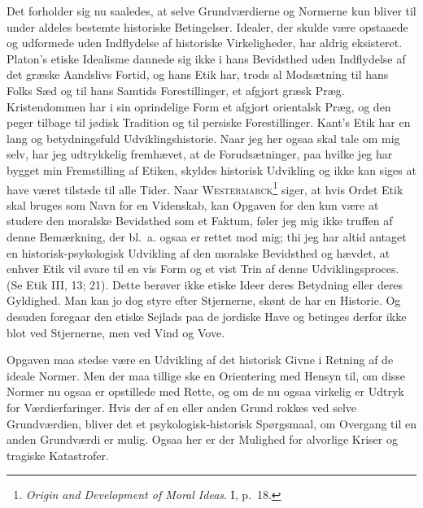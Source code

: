 \documentclass[12pt]{article}
\newcommand{\opage}[1]{\marginnote{\footnotesize\textit{[#1]}}}
\begin{document}
Det forholder sig nu saaledes, at selve Grundværdierne og Normerne kun
bliver til under aldeles bestemte historiske Betingelser. Idealer, der
skulde være opstaaede og udformede uden Indflydelse af historiske
Virkeligheder, har aldrig eksisteret. Platon's etiske Idealisme dannede
sig ikke i hans Bevidsthed uden Indflydelse af det græske Aandslivs
Fortid, og hans Etik har, trods al Modsætning til hans Folks Sæd og til
hans Samtids Forestillinger, et afgjort græsk Præg. Kristendommen har i
sin oprindelige Form et afgjort orientalsk Præg, og den peger tilbage
til jødisk Tradition og til persiske Forestillinger. Kant's Etik har en
lang og betydningsfuld Udviklingshistorie. Naar jeg her ogsaa skal tale
om mig selv, har jeg udtrykkelig fremhævet, at de Forudsætninger, paa
hvilke jeg har bygget min Fremstilling af Etiken, skyldes historisk
Udvikling og ikke kan siges at have været tilstede til alle Tider. Naar
\textsc{Westermarck}\footnote{\textit{Origin and Development of Moral
Ideas}. I, p.~18.} siger, at hvis Ordet \guillemotright
Etik\guillemotleft{} skal bruges som Navn for en Videnskab, kan Opgaven
for den kun være at studere den moralske Bevidsthed som et Faktum, føler
jeg mig ikke truffen af denne Bemærkning, der bl.~a. ogsaa er rettet mod
mig; thi jeg har altid antaget en historisk-psykologisk Udvikling af den
moralske Bevidsthed og hævdet, at enhver Etik vil svare til en vis Form
og et vist Trin af denne Udviklingsproces. (Se Etik III, 13; 21). Dette
berøver ikke etiske Ideer deres Betydning eller deres Gyldighed. Man kan
jo dog styre efter Stjernerne, skønt de har en Historie. Og desuden
foregaar den etiske Sejlads paa
\opage{90} de jordiske Have og betinges derfor ikke blot ved Stjernerne, men ved
Vind og Vove.

Opgaven maa stedse være en Udvikling af det historisk Givne i Retning
af de ideale Normer. Men der maa tillige ske en Orientering med Hensyn
til, om disse Normer nu ogsaa er opstillede med Rette, og om de nu
ogsaa virkelig er Udtryk for Værdierfaringer. Hvis der af en eller
anden Grund rokkes ved selve Grundværdien, bliver det et
psykologisk-historisk Spørgsmaal, om Overgang til en anden Grundværdi
er mulig. Ogsaa her er der Mulighed for alvorlige Kriser og tragiske
Katastrofer.
\end{document}
